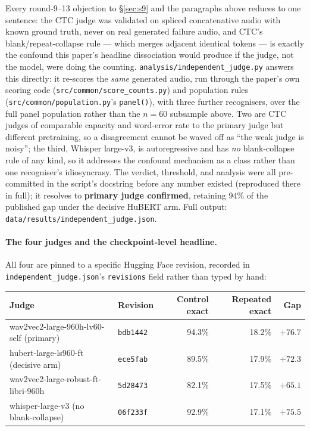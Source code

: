 \documentclass[11pt]{article}
\begin{document}
Every round-9--13 objection to \S\ref{sec:s9} and the paragraphs above reduces
to one sentence: the CTC judge was validated on spliced concatenative audio
with known ground truth, never on real generated failure audio, and CTC's
blank/repeat-collapse rule --- which merges adjacent identical tokens --- is
exactly the confound this paper's headline dissociation would produce if the
judge, not the model, were doing the counting. \texttt{analysis/independent\_judge.py}
answers this directly: it re-scores the \emph{same} generated audio, run
through the paper's own scoring code (\texttt{src/common/score\_counts.py})
and population rules (\texttt{src/common/population.py}'s \texttt{panel()}),
with three further recognisers, over the full panel population rather than
the $n{=}60$ subsample above. Two are CTC judges of comparable capacity and
word-error rate to the primary judge but different pretraining, so a
disagreement cannot be waved off as ``the weak judge is noisy''; the third,
Whisper large-v3, is autoregressive and has \emph{no} blank-collapse rule of
any kind, so it addresses the confound mechanism as a class rather than one
recogniser's idiosyncrasy. The verdict, threshold, and analysis were all
pre-committed in the script's docstring before any number existed (reproduced
there in full); it resolves to \textbf{primary judge confirmed}, retaining
$94\%$ of the published gap under the decisive HuBERT arm. Full output:
\texttt{data/results/independent\_judge.json}.

\paragraph{The four judges and the checkpoint-level headline.} All four are
pinned to a specific Hugging Face revision, recorded in
\texttt{independent\_judge.json}'s \texttt{revisions} field rather than typed
by hand:

\begin{center}
\small
\begin{tabular}{llrrr}
\toprule
Judge & Revision & Control exact & Repeated exact & Gap \\
\midrule
wav2vec2-large-960h-lv60-self (primary) & \texttt{bdb1442} & 94.3\% & 18.2\% & $+76.7$ \\
hubert-large-ls960-ft (decisive arm) & \texttt{ece5fab} & 89.5\% & 17.9\% & $+72.3$ \\
wav2vec2-large-robust-ft-libri-960h & \texttt{5d28473} & 82.1\% & 17.5\% & $+65.1$ \\
whisper-large-v3 (no blank-collapse) & \texttt{06f233f} & 92.9\% & 17.1\% & $+75.5$ \\
\bottomrule
\end{tabular}
\end{center}
\end{document}
